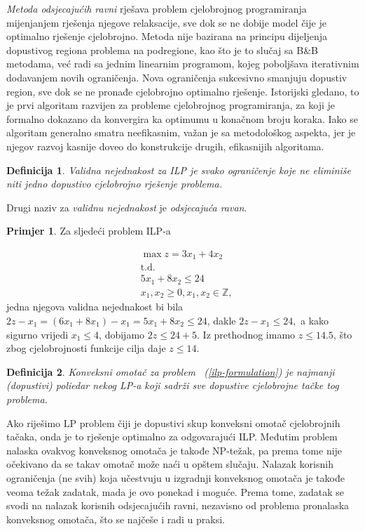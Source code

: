 \documentclass[b5paper, utf8, 11pt, colorlinks]{book}
\newtheorem{definition}{Definicija}[chapter]
\theoremstyle{definition}
\newtheorem{primjer}{Primjer}[chapter]
\begin{document}
\emph{Metoda odsjecajućih ravni} rješava problem cjelobrojnog  programiranja mijenjanjem rješenja njegove relaksacije, sve dok se ne dobije model čije je optimalno rješenje cjelobrojno. Metoda nije bazirana na principu dijeljenja dopustivog regiona problema na podregione, kao što je to slučaj sa B\&B metodama, već radi sa jednim linearnim programom, kojeg poboljšava iterativnim dodavanjem novih ograničenja. Nova ograničenja sukcesivno smanjuju dopustiv region, sve dok se ne pronađe cjelobrojno optimalno rješenje.   
 Istorijski gledano, to je prvi algoritam razvijen za probleme cjelobrojnog programiranja, za koji je formalno dokazano da konvergira ka optimumu u konačnom broju koraka. Iako se algoritam generalno smatra   neefikasnim, važan je sa metodološkog aspekta, jer je njegov razvoj kasnije doveo do konstrukcije drugih, efikasnijih algoritama.  
  
 \begin{definition}{Validna nejednakost} za ILP je svako ograničenje koje ne eliminiše niti   jedno  dopustivo cjelobrojno rješenje problema.
 \end{definition}
 Drugi naziv za \emph{validnu nejednakost} je \emph{odsjecajuća ravan}.

\begin{primjer}
Za sljedeći problem ILP-a
\end{primjer}
  \begin{align*}
    & \max z = 3x_1 + 4 x_2 \\
    & \mbox{t.d.} \\
    & 5x_1 + 8x_2\leq 24 \\
    & x_1, x_2 \geq 0, x_1,x_2\in \mathbb{Z},
 \end{align*}
jedna njegova validna nejednakost bi bila  $2z - x_1 = (6x_1 + 8x_1 ) - x_1 = 5x_1 + 8 x_2  \leq 24$, dakle $2z - x_1 \leq 24,$ a kako sigurno vrijedi $x_1 \leq 4$, dobijamo $2z \leq 24 + 5$. Iz prethodnog imamo $z \leq 14.5$, što zbog cjelobrojnosti funkcije cilja daje $z \leq 14$.


\begin{definition}
      Konveksni omotač za problem  ~(\ref{ilp-formulation}) je najmanji (dopustivi) poliedar nekog LP-a koji sadrži sve dopustive cjelobrojne tačke tog problema.
\end{definition}
Ako riješimo LP problem čiji je dopustivi skup konveksni omotač cjelobrojnih tačaka, onda je to rješenje optimalno za odgovarajući ILP. Međutim problem nalaska ovakvog konveksnog omotača je takođe  NP-težak, pa prema tome nije očekivano da se takav   omotač može naći u opštem slučaju. Nalazak korisnih ograničenja (ne svih) koja učestvuju u izgradnji konveksnog omotača je takođe veoma težak zadatak, mada je ovo ponekad i moguće. Prema tome, zadatak se svodi na nalazak korisnih odsjecajućih ravni, nezavisno od problema pronalaska konveksnog omotača, što se najčeše i radi  u praksi. 
\end{document}
